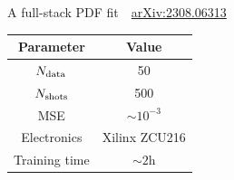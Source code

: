 \documentclass[8pt, xcolor={svgnames}, hyperref={linkcolor=black}]{beamer}
\begin{document}
\begin{frame}{A full-stack PDF fit \hfill \faBook\,\, \href{https://arxiv.org/abs/2308.06313}{arXiv:2308.06313}}
\begin{multicols}{2}
\begin{table}
\flushright
\vspace{-0.5cm}
\begin{tabular}{cc}
\hline \hline 
\textbf{Parameter} & \textbf{Value} \\
\hline 
$N_{\rm data}$ & 50 \\
$N_{\rm shots}$ & 500 \\
MSE & $\sim 10^{-3}$ \\
Electronics & Xilinx ZCU216 \\
Training time & $\sim 2$h \\
\hline \hline
\end{tabular}
\end{table}
\vspace{0.5cm}
\end{multicols}
\end{frame}
\end{document}

